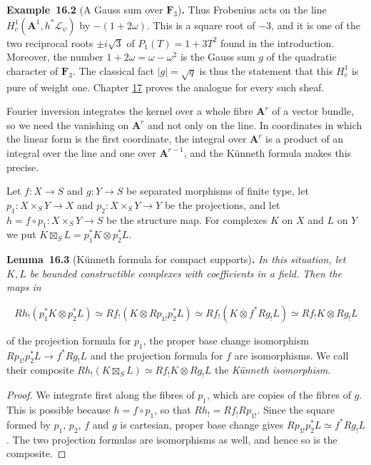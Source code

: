 \documentclass[11pt]{article}
\newenvironment{bpstatement}[2]{\par\addvspace{0.6\baselineskip}\noindent\textbf{#1}#2\textbf{.}\enspace\ignorespaces}
  {\par\addvspace{0.4\baselineskip}}
\newenvironment{bpstatementit}[2]{\begin{bpstatement}{#1}{#2}\itshape\ignorespaces}{\end{bpstatement}}
\begin{document}
\begin{bpstatement}{Example~16.2}{ (A Gauss sum over $\mathbf F_3$)}
Thus Frobenius acts on the line \(H^1_c(\mathbf A^1,h^*\mathcal L_\psi)\) by \(-(1+2\omega)\). This is a square root of \(-3\), and it is one of the two reciprocal roots \(\pm i\sqrt3\) of \(P_1(T)=1+3T^2\) found in the introduction. Moreover, the number \(1+2\omega=\omega-\omega^2\) is the Gauss sum \(g\) of the quadratic character of \(\mathbf F_3\). The classical fact \(|g|=\sqrt q\) is thus the statement that this \(H^1_c\) is pure of weight one. Chapter \hyperref[bp223]{17} proves the analogue for every such sheaf.
\end{bpstatement}

\label{bp175}%
Fourier inversion integrates the kernel over a whole fibre \(\mathbf A^r\) of a vector bundle, so we need the vanishing on \(\mathbf A^r\) and not only on the line. In coordinates in which the linear form is the first coordinate, the integral over \(\mathbf A^r\) is a product of an integral over the line and one over \(\mathbf A^{r-1}\), and the Künneth formula makes this precise.

Let \(f:X\to S\) and \(g:Y\to S\) be separated morphisms of finite type, let \(p_1:X\times_SY\to X\) and \(p_2:X\times_SY\to Y\) be the projections, and let \(h=f\circ p_1:X\times_SY\to S\) be the structure map. For complexes \(K\) on \(X\) and \(L\) on \(Y\) we put \(K\boxtimes_SL=p_1^*K\otimes p_2^*L\).

\label{bp176}%
\begin{bpstatementit}{Lemma~16.3}{ (Künneth formula for compact supports)}
In this situation, let \(K,L\) be bounded constructible complexes with coefficients in a field. Then the maps in

\[
Rh_!(p_1^*K\otimes p_2^*L)
\simeq Rf_!(K\otimes Rp_{1!}p_2^*L)
\simeq Rf_!(K\otimes f^*Rg_!L)
\simeq Rf_!K\otimes Rg_!L
\]

of the projection formula for \(p_1\), the proper base change isomorphism \(Rp_{1!}p_2^*L\to f^*Rg_!L\) and the projection formula for \(f\) are isomorphisms. We call their composite \(Rh_!(K\boxtimes_SL)\simeq Rf_!K\otimes Rg_!L\) the \emph{Künneth isomorphism}.
\end{bpstatementit}

\begin{proof}[{Proof}]\label{bp177}%
We integrate first along the fibres of \(p_1\), which are copies of the fibres of \(g\). This is possible because \(h=f\circ p_1\), so that \(Rh_!=Rf_!Rp_{1!}\). Since the square formed by \(p_1\), \(p_2\), \(f\) and \(g\) is cartesian, proper base change gives \(Rp_{1!}p_2^*L\simeq f^*Rg_!L\). The two projection formulas are isomorphisms as well, and hence so is the composite.
\end{proof}
\end{document}
